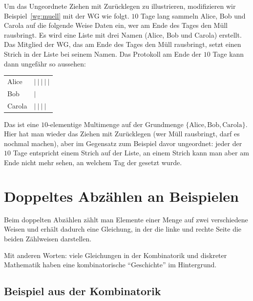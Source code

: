 \begin{bsp}
	Um das Ungeordnete Ziehen mit Zurücklegen zu illustrieren, modifizieren wir  Beispiel~\ref{wg:muell} mit der WG wie folgt. $10$ Tage lang sammeln Alice, Bob und Carola auf die folgende Weise Daten ein, wer am Ende des Tages den Müll rausbringt. Es wird eine Liste mit drei Namen (Alice, Bob und Carola) erstellt. Das Mitglied der WG, das am Ende des Tages den Müll rausbringt, setzt einen Strich in der Liste bei seinem Namen. Das Protokoll am Ende der $10$ Tage kann dann ungefähr so aussehen: 
	\begin{center}
	\begin{tabular}{ll}
			Alice & $| \  | \ | \  | \ | $ 
			\\ Bob &  $| $ 
			\\ Carola & $| \ | \  | \  |$ 
	\end{tabular} 
	\end{center} 
	
	
	Das ist eine $10$-elementige Multimenge auf der Grundmenge $\{ \text{Alice}, \text{Bob}, \text{Carola}\}$.  Hier hat man wieder das Ziehen mit Zurücklegen (wer Müll rausbringt, darf es nochmal machen), aber im Gegensatz zum Beispiel davor ungeordnet: jeder der $10$ Tage entspricht einem Strich auf der Liste, an einem Strich kann man aber am Ende nicht mehr sehen, an welchem Tag der gesetzt wurde. 
\end{bsp} 

\section{Doppeltes Abzählen an Beispielen} 

\begin{bem}
	Beim doppelten Abzählen zählt man Elemente einer Menge auf zwei verschiedene Weisen und erhält dadurch eine Gleichung, in der die linke und rechte Seite die beiden Zählweisen darstellen. 
	
	Mit anderen Worten: viele Gleichungen in der Kombinatorik und diskreter Mathematik haben eine kombinatorische ``Geschichte'' im Hintergrund. 
\end{bem} 

\subsection{Beispiel aus der Kombinatorik}

